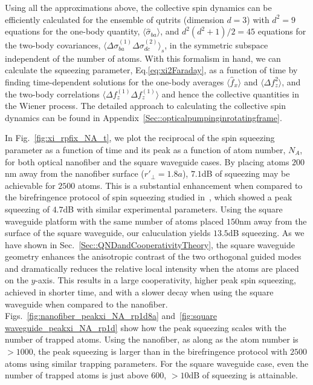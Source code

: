 \documentclass[preprint,aps,pra,onecolumn,superscriptaddress]{revtex4-1} %
\newcommand{\expect}[1]{\big\langle #1 \big\rangle}
\begin{document}
Using all the approximations above, the collective spin dynamics can be efficiently calculated for the ensemble of qutrits (dimension  $d=3$) with $ d^2=9 $ equations for the one-body quantity, $ \expect{\hat{\sigma}_{ba}} $, and $ d^2(d^2+1)/2=45 $ equations for the two-body covariances, $ \expect{\Delta \sigma_{ba}^{(1)}\Delta\sigma_{dc}^{(2)} }_s $, in the symmetric subspace independent of the number of atoms.  With this formalism in hand, we can calculate the squeezing parameter, Eq.\eqref{eq:xi2Faraday}, as a function of time by finding time-dependent solutions for the one-body averages $\expect{\hat{f}_x}$ and  $\expect{\Delta f_z^2}$, and the two-body correlations $\expect{\Delta f_z^{(1)} \Delta f_z^{(1)}}$ and hence the collective quantities in the Wiener process.  The detailed approach to calculating the collective spin dynamics can be found in Appendix~\ref{Sec::opticalpumpinginrotatingframe}. 

In Fig.~\ref{fig:xi_rpfix_NA_t}, we plot the reciprocal of the spin squeezing parameter as a function of time and its peak as a function of atom number, $ N_A $, for both optical nanofiber and the square waveguide cases. By placing atoms $ 200 $nm away from the nanofiber surface ($ r'\!_\perp=1.8a $), $ 7.1 $dB of squeezing may be achievable for $ 2500 $ atoms. This is a substantial enhancement when compared to the birefringence protocol of spin squeezing  studied in~\cite{Qi2016}, which showed a peak squeezing  of $ 4.7 $dB with  similar experimental parameters. Using the square waveguide platform with the same number of atoms placed $150 $nm away from the surface of the square waveguide, our caluculation yields $13.5$dB  squeezing. As we have shown in Sec.~\ref{Sec::QNDandCooperativityTheory}, the square waveguide geometry enhances the anisotropic contrast of the two orthogonal guided modes and dramatically reduces the relative local intensity when the atoms are placed on the $ y $-axis. This results in a large cooperativity, higher peak spin squeezing, achieved in shorter time, and with a slower decay when using the square waveguide when compared to the nanofiber. Figs.~\ref{fig:nanofiber_peakxi_NA_rp1d8a} and~\ref{fig:square waveguide_peakxi_NA_rp1d} show how the peak squeezing scales with the number of trapped atoms. Using the nanofiber, as along as the atom number is  $>1000 $, the peak  squeezing  is larger than in the birefringence protocol with $ 2500 $ atoms using similar trapping parameters. For the square waveguide case, even the number of trapped atoms is just above $ 600 $, $ >10 $dB of  squeezing is attainable. 
\end{document}

